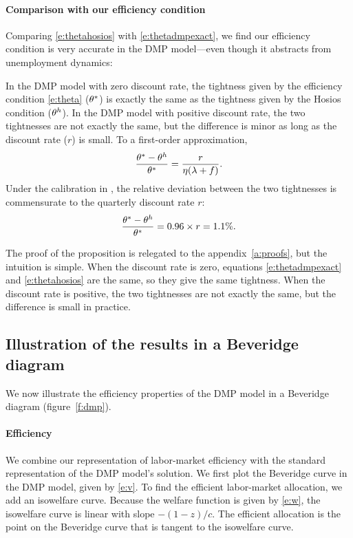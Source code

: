 \documentclass[letterpaper,12pt,leqno]{article}
\begin{document}
\paragraph{Comparison with our efficiency condition} Comparing \eqref{e:thetahosios} with \eqref{e:thetadmpexact}, we find our efficiency condition is very accurate in the DMP model---even though it abstracts from unemployment dynamics:

\begin{proposition}\label{p:hosios} In the DMP model with zero discount rate, the tightness given by the efficiency condition \eqref{e:theta} ($\theta^*$) is exactly the same as the tightness given by the Hosios condition ($\theta^h$). In the DMP model with positive discount rate, the two tightnesses are not exactly the same, but the difference is minor as long as the discount rate ($r$) is small. To a first-order approximation,
\begin{equation*}
\frac{\theta^*-\theta^h}{\theta^*} = \frac{r}{\eta (\lambda+f)}. 
\end{equation*}
Under the calibration in , the relative deviation between the two tightnesses is commensurate to the quarterly discount rate $r$:
\begin{equation*}
\frac{\theta^*-\theta^h}{\theta^*} = 0.96\times r = 1.1\%. 
\end{equation*}\end{proposition}

The proof of the proposition is relegated to the appendix~\ref{a:proofs}, but the intuition is simple. When the discount rate is zero, equations \eqref{e:thetadmpexact} and \eqref{e:thetahosios} are the same, so they give the same tightness. When the discount rate is positive, the two tightnesses are not exactly the same, but the difference is small in practice. 

\subsection{Illustration of the results in a Beveridge diagram}

We now illustrate the efficiency properties of the DMP model in a Beveridge diagram (figure~\ref{f:dmp}). 

\paragraph{Efficiency} We combine our representation of labor-market efficiency with the standard representation of the DMP model's solution. We first plot the Beveridge curve in the DMP model, given by \eqref{e:v}. To find the efficient labor-market allocation, we add an isowelfare curve. Because the welfare function is given by \eqref{e:w}, the isowelfare curve is linear with slope $-(1-z)/c$. The efficient allocation is the point on the Beveridge curve that is tangent to the isowelfare curve.
\end{document}
